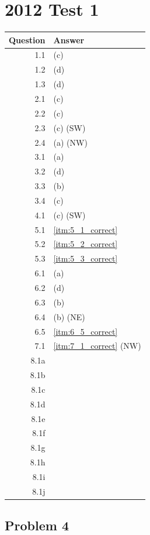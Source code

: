 \setcounter{section}{11}
\section{2012 Test 1}
\begin{center}
\begin{tabular}{r | l}
	Question & Answer   \\ \hline
	1.1      & (c)      \\
	1.2      & (d)      \\
	1.3      & (d)      \\ \hline
	2.1      & (c)      \\
	2.2      & (c)      \\
	2.3      & (c) (SW) \\
	2.4      & (a) (NW) \\ \hline
	3.1      & (a)      \\
	3.2      & (d)      \\
	3.3      & (b)      \\
	3.4      & (c)      \\ \hline
	4.1      & (c) (SW) \\ \hline
	5.1      & \ref{itm:5_1_correct} \\
	5.2      & \ref{itm:5_2_correct} \\
	5.3      & \ref{itm:5_3_correct} \\ \hline
	6.1      & (a)      \\
	6.2      & (d)      \\
	6.3      & (b)      \\
	6.4      & (b) (NE) \\
	6.5      & \ref{itm:6_5_correct} \\ \hline
	7.1      & \ref{itm:7_1_correct} (NW) \\ \hline
	8.1a     &          \\
	8.1b     &          \\
	8.1c     &          \\
	8.1d     &          \\
	8.1e     &          \\
	8.1f     &          \\
	8.1g     &          \\
	8.1h     &          \\
	8.1i     &          \\
	8.1j     &          
\end{tabular}
\end{center}
\setcounter{subsection}{3}
\subsection{Problem 4}
